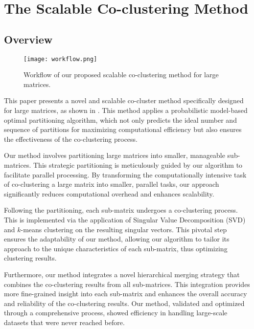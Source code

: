 \section{The Scalable Co-clustering Method}
\label{sec:method}
\subsection{Overview}

\begin{figure*}[htbp]
    \centering
    \texttt{[image: workflow.png]}
    \caption{Workflow of our proposed scalable co-clustering method for large matrices.}
    \label{fig:workflow}
\end{figure*}
This paper presents a novel and scalable co-cluster method specifically designed for large matrices, as shown in . This method applies a probabilistic model-based optimal partitioning algorithm, which not only predicts the ideal number and sequence of partitions for maximizing computational efficiency but also ensures the effectiveness of the co-clustering process.

Our method involves partitioning large matrices into smaller, manageable sub-matrices. This strategic partitioning is meticulously guided by our algorithm to facilitate parallel processing. By transforming the computationally intensive task of co-clustering a large matrix into smaller, parallel tasks, our approach significantly reduces computational overhead and enhances scalability.

Following the partitioning, each sub-matrix undergoes a co-clustering process. This is implemented via the application of Singular Value Decomposition (SVD) and $k$-means clustering on the resulting singular vectors. This pivotal step ensures the adaptability of our method, allowing our algorithm to tailor its approach to the unique characteristics of each sub-matrix, thus optimizing clustering results.

Furthermore, our method integrates a novel hierarchical merging strategy that combines the co-clustering results from all sub-matrices. This integration provides more fine-grained insight into each sub-matrix and enhances the overall accuracy and reliability of the co-clustering results. Our method, validated and optimized through a comprehensive process, showed efficiency in handling large-scale datasets that were never reached before.  
 

